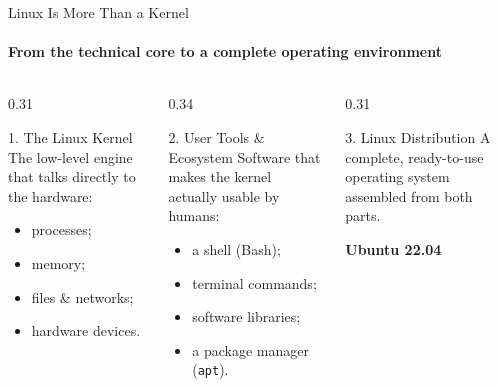 \begin{frame}{Linux Is More Than a Kernel}
\framesubtitle{From the technical core to a complete operating environment}

\footnotesize

\begin{columns}[T,onlytextwidth]

    \begin{column}{0.31\textwidth}
        \begin{block}{1. The Linux Kernel}
            The low-level engine that talks directly to the hardware:
            \begin{itemize}
                \setlength{\itemsep}{0.2em}
                \item processes;
                \item memory;
                \item files \& networks;
                \item hardware devices.
            \end{itemize}
        \end{block}
    \end{column}

    \begin{column}{0.34\textwidth}
        \begin{block}{2. User Tools \& Ecosystem}
            Software that makes the kernel actually usable by humans:
            \begin{itemize}
                \setlength{\itemsep}{0.2em}
                \item a shell (Bash);
                \item terminal commands;
                \item software libraries;
                \item a package manager (\texttt{apt}).
            \end{itemize}
        \end{block}
    \end{column}

    \begin{column}{0.31\textwidth}
        \begin{exampleblock}{3. Linux Distribution}
            A complete, ready-to-use operating system assembled from both parts.
            
            \vspace{0.25cm}
            \centering
            \colorbox{um6p-color-light-blue!40}{
                \parbox[c][0.6cm][c]{0.85\textwidth}{
                    \centering
                    \textbf{Ubuntu 22.04}\\
                }
            }
        \end{exampleblock}
    \end{column}


\end{columns}
\end{frame}

